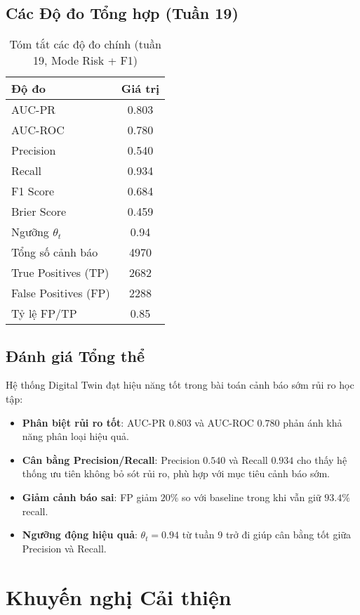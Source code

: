 \documentclass[12pt,a4paper]{article}
\begin{document}
\subsection{Các Độ đo Tổng hợp (Tuần 19)}

\begin{table}[H]
\centering
\caption{Tóm tắt các độ đo chính (tuần 19, Mode Risk + F1)}
\label{tab:summary}
\begin{tabular}{lS}
\toprule
Độ đo & Giá trị \\
\midrule
AUC-PR & 0.803 \\
AUC-ROC & 0.780 \\
Precision & 0.540 \\
Recall & 0.934 \\
F1 Score & 0.684 \\
Brier Score & 0.459 \\
Ngưỡng $\theta_t$ & 0.94 \\
Tổng số cảnh báo & 4970 \\
True Positives (TP) & 2682 \\
False Positives (FP) & 2288 \\
Tỷ lệ FP/TP & 0.85 \\
\bottomrule
\end{tabular}
\end{table}

\subsection{Đánh giá Tổng thể}

Hệ thống Digital Twin đạt hiệu năng tốt trong bài toán cảnh báo sớm rủi ro học tập:
\begin{itemize}
    \item \textbf{Phân biệt rủi ro tốt}: AUC-PR $0.803$ và AUC-ROC $0.780$ phản ánh khả năng phân loại hiệu quả.
    \item \textbf{Cân bằng Precision/Recall}: Precision $0.540$ và Recall $0.934$ cho thấy hệ thống ưu tiên không bỏ sót rủi ro, phù hợp với mục tiêu cảnh báo sớm.
    \item \textbf{Giảm cảnh báo sai}: FP giảm $20\%$ so với baseline trong khi vẫn giữ $93.4\%$ recall.
    \item \textbf{Ngưỡng động hiệu quả}: $\theta_t = 0.94$ từ tuần 9 trở đi giúp cân bằng tốt giữa Precision và Recall.
\end{itemize}

\section{Khuyến nghị Cải thiện}
\end{document}

